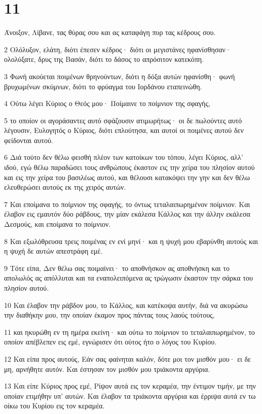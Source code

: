 \chapter{11}

\par Άνοιξον, Λίβανε, τας θύρας σου και ας καταφάγη πυρ τας κέδρους σου.
\par 2 Ολόλυξον, ελάτη, διότι έπεσεν κέδρος· διότι οι μεγιστάνες ηφανίσθησαν· ολολύξατε, δρυς της Βασάν, διότι το δάσος το απρόσιτον κατεκόπη.
\par 3 Φωνή ακούεται ποιμένων θρηνούντων, διότι η δόξα αυτών ηφανίσθη· φωνή βρυχωμένων σκύμνων, διότι το φρύαγμα του Ιορδάνου εταπεινώθη.
\par 4 Ούτω λέγει Κύριος ο Θεός μου· Ποίμαινε το ποίμνιον της σφαγής,
\par 5 το οποίον οι αγοράσαντες αυτό σφάζουσιν ατιμωρήτως· οι δε πωλούντες αυτό λέγουσιν, Ευλογητός ο Κύριος, διότι επλούτησα, και αυτοί οι ποιμένες αυτού δεν φείδονται αυτού.
\par 6 Διά τούτο δεν θέλω φεισθή πλέον των κατοίκων του τόπου, λέγει Κύριος, αλλ' ιδού, εγώ θέλω παραδώσει τους ανθρώπους έκαστον εις την χείρα του πλησίον αυτού και εις την χείρα του βασιλέως αυτού, και θέλουσι κατακόψει την γην και δεν θέλω ελευθερώσει αυτούς εκ της χειρός αυτών.
\par 7 Και εποίμανα το ποίμνιον της σφαγής, το όντως τεταλαιπωρημένον ποίμνιον. Και έλαβον εις εμαυτόν δύο ράβδους, την μίαν εκάλεσα Κάλλος και την άλλην εκάλεσα Δεσμούς, και εποίμανα το ποίμνιον.
\par 8 Και εξωλόθρευσα τρεις ποιμένας εν ενί μηνί· και η ψυχή μου εβαρύνθη αυτούς και η ψυχή δε αυτών απεστράφη εμέ.
\par 9 Τότε είπα, Δεν θέλω σας ποιμαίνει· το αποθνήσκον ας αποθνήσκη και το απολωλός ας απόλλυται και τα εναπολειπόμενα ας τρώγωσιν έκαστον την σάρκα του πλησίον αυτού.
\par 10 Και έλαβον την ράβδον μου, το Κάλλος, και κατέκοψα αυτήν, διά να ακυρώσω την διαθήκην μου, την οποίαν έκαμον προς πάντας τους λαούς τούτους,
\par 11 και ηκυρώθη εν τη ημέρα εκείνη· και ούτω το ποίμνιον το τεταλαιπωρημένον, το οποίον απέβλεπεν εις εμέ, εγνώρισεν ότι ούτος ήτο ο λόγος του Κυρίου.
\par 12 Και είπα προς αυτούς, Εάν σας φαίνηται καλόν, δότε μοι τον μισθόν μου· ει δε μη, αρνήθητε αυτόν. Και έστησαν τον μισθόν μου τριάκοντα αργύρια.
\par 13 Και είπε Κύριος προς εμέ, Ρίψον αυτά εις τον κεραμέα, την έντιμον τιμήν, με την οποίαν ετιμήθην υπ' αυτών. Και έλαβον τα τριάκοντα αργύρια και έρριψα αυτά εν τω οίκω του Κυρίου εις τον κεραμέα.
